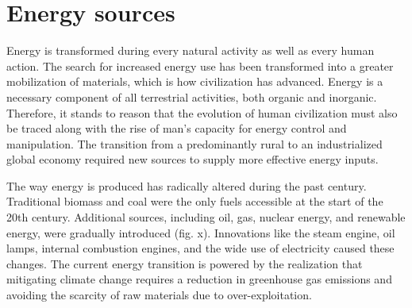 \clearpage

\section[Energy sources]{Energy sources}
\label{sec:energy_sources}

Energy is transformed during every natural activity as well as every human action. The search for increased energy use has been transformed into a greater mobilization of materials, which is how civilization has advanced. Energy is a necessary component of all terrestrial activities, both organic and inorganic. Therefore, it stands to reason that the evolution of human civilization must also be traced along with the rise of man's capacity for energy control and manipulation. The transition from a predominantly rural to an industrialized global economy required new sources to supply more effective energy inputs.\autocite{smil2000energy} 

The way energy is produced has radically altered during the past century. Traditional biomass and coal were the only fuels accessible at the start of the 20th century. Additional sources, including oil, gas, nuclear energy, and renewable energy, were gradually introduced\autocite{owidenergy} (fig. x). Innovations like the steam engine, oil lamps, internal combustion engines, and the wide use of electricity caused these changes.\autocite{smil2017bp} The current energy transition is powered by the realization that mitigating climate change requires a reduction in greenhouse gas emissions and  avoiding the scarcity of raw materials due to over-exploitation.

